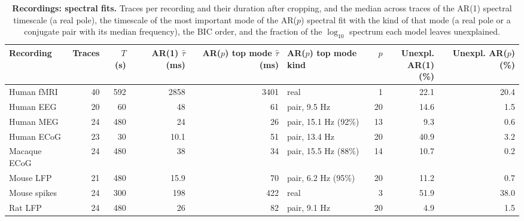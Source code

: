 \begin{table}[h]
\caption{\textbf{Recordings: spectral fits.} Traces per recording and their duration after cropping, and the median across traces of the AR(1) spectral timescale (a real pole), the timescale of the most important mode of the AR($p$) spectral fit with the kind of that mode (a real pole or a conjugate pair with its median frequency), the BIC order, and the fraction of the $\log_{10}$ spectrum each model leaves unexplained.}\label{tab:s_recordings}
\setlength{\tabcolsep}{3pt}
\begin{tabular}{lrrrrlrrr}
\toprule
Recording & Traces & $T$ (s) & \shortstack[c]{AR(1) \\ $\hat\tau$ (ms)} & \shortstack[c]{AR($p$) top \\ mode $\hat\tau$ (ms)} & \shortstack[c]{AR($p$) top \\ mode kind} & $p$ & \shortstack[c]{Unexpl. \\ AR(1) (\%)} & \shortstack[c]{Unexpl. \\ AR($p$) (\%)} \\
\midrule
Human fMRI & 40 & 592 & 2858 & 3401 & real & 1 & 22.1 & 20.4 \\
Human EEG & 20 & 60 & 48 & 61 & pair, 9.5 Hz & 20 & 14.6 & 1.5 \\
Human MEG & 24 & 480 & 24 & 26 & pair, 15.1 Hz (92\%) & 13 & 9.3 & 0.6 \\
Human ECoG & 23 & 30 & 10.1 & 51 & pair, 13.4 Hz & 20 & 40.9 & 3.2 \\
Macaque ECoG & 24 & 480 & 38 & 34 & pair, 15.5 Hz (88\%) & 14 & 10.7 & 0.2 \\
Mouse LFP & 21 & 480 & 15.9 & 70 & pair, 6.2 Hz (95\%) & 20 & 11.2 & 0.7 \\
Mouse spikes & 24 & 300 & 198 & 422 & real & 3 & 51.9 & 38.0 \\
Rat LFP & 24 & 480 & 26 & 82 & pair, 9.1 Hz & 20 & 4.9 & 1.5 \\
\bottomrule
\end{tabular}
\end{table}
